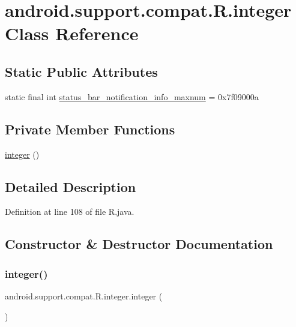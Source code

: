 \hypertarget{classandroid_1_1support_1_1compat_1_1_r_1_1integer}{}\section{android.\+support.\+compat.\+R.\+integer Class Reference}
\label{classandroid_1_1support_1_1compat_1_1_r_1_1integer}
\subsection*{Static Public Attributes}
\begin{DoxyCompactItemize}
\item 
static final int \mbox{\hyperlink{classandroid_1_1support_1_1compat_1_1_r_1_1integer_a5d0dcdb625a5957f6a037d53cde095c6}{status\+\_\+bar\+\_\+notification\+\_\+info\+\_\+maxnum}} = 0x7f09000a
\end{DoxyCompactItemize}
\subsection*{Private Member Functions}
\begin{DoxyCompactItemize}
\item 
\mbox{\hyperlink{classandroid_1_1support_1_1compat_1_1_r_1_1integer_a793e3158579ace534132fa612e330027}{integer}} ()
\end{DoxyCompactItemize}


\subsection{Detailed Description}


Definition at line 108 of file R.\+java.



\subsection{Constructor \& Destructor Documentation}
\mbox{\label{classandroid_1_1support_1_1compat_1_1_r_1_1integer_a793e3158579ace534132fa612e330027}} 
\subsubsection{\texorpdfstring{integer()}{integer()}}
{\footnotesize\ttfamily android.\+support.\+compat.\+R.\+integer.\+integer (\begin{DoxyParamCaption}{ }\end{DoxyParamCaption})\hspace{0.3cm}{\ttfamily [private]}}



